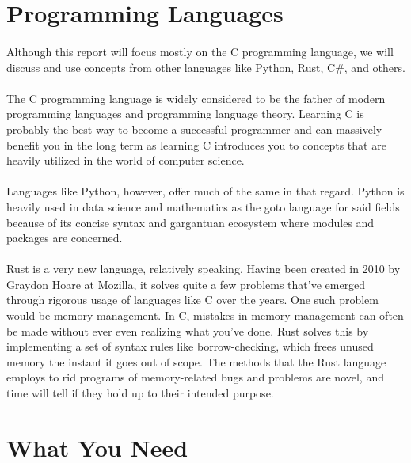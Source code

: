 \section{Programming Languages}
\paragraph{}
   Although this report will focus mostly on the C programming language, we will discuss and use concepts from other languages like Python, Rust, C\#,
   and others.

\paragraph{}
   The C programming language is widely considered to be the father of modern programming languages and programming language theory. Learning C is
   probably the best way to become a successful programmer and can massively benefit you in the long term as learning C introduces you to concepts
   that are heavily utilized in the world of computer science.

\paragraph{}
   Languages like Python, however, offer much of the same in that regard. Python is heavily used in data science and mathematics as the goto language
   for said fields because of its concise syntax and gargantuan ecosystem where modules and packages are concerned.

\paragraph{}
   Rust is a very new language, relatively speaking. Having been created in 2010 by Graydon Hoare at Mozilla, it solves quite a few problems that've
   emerged through rigorous usage of languages like C over the years. One such problem would be memory management. In C, mistakes in memory management
   can often be made without ever even realizing what you've done. Rust solves this by implementing a set of syntax rules like borrow-checking, which
   frees unused memory the instant it goes out of scope. The methods that the Rust language employs to rid programs of memory-related bugs and
   problems are novel, and time will tell if they hold up to their intended purpose.

\section{What You Need}
